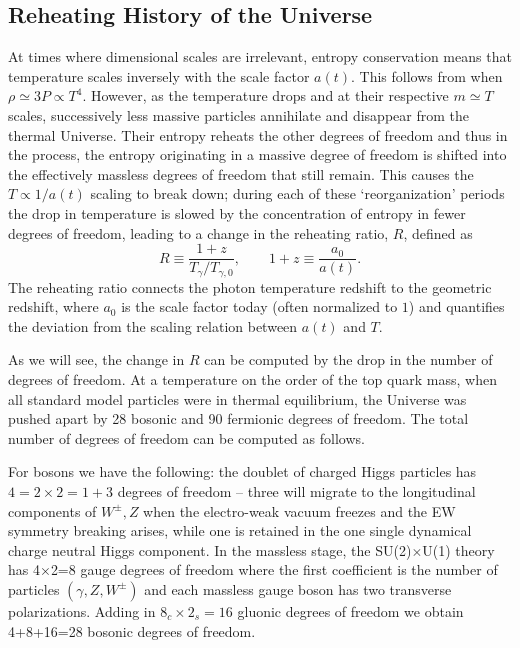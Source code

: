 
\subsection{Reheating History of the Universe}\label{Eralink}

At times where dimensional scales are irrelevant, entropy conservation means that  temperature scales inversely with the scale factor $a(t)$. This follows from  when $ \rho\simeq 3P   \propto T^4$. However, as the temperature drops and at their respective $m\simeq T$ scales, successively less massive particles annihilate and disappear from the thermal Universe. Their entropy reheats the other degrees of freedom and thus in the process, the entropy originating in a massive degree of freedom is shifted into the effectively massless degrees of freedom that still remain.  This causes the  $T\propto 1/a(t)$ scaling to break down; during each of these `reorganization' periods the drop in temperature is slowed by the concentration of entropy in fewer degrees of freedom, leading to a change in the reheating ratio, $R$, defined as
\begin{equation}\label{redshiftratio}
R\equiv \frac{1+z}{ T_\gamma/T_{\gamma,0}}, \qquad 1+z\equiv \frac{a_{0}}{a(t)}.
\end{equation}
The reheating ratio connects the photon temperature redshift to the geometric redshift, where $a_0$ is the scale factor today (often normalized to $1$) and quantifies the deviation from the scaling relation between $a(t)$ and $T$.

As we will see, the change in $R$ can be computed by the drop in the number of degrees of freedom.  At a temperature on the order of the top quark mass, when all standard model particles were in thermal equilibrium, the Universe was pushed apart by 28 bosonic and 90 fermionic degrees of freedom. The total number of degrees of freedom can be computed as follows.  

For bosons we have the following: the doublet of charged Higgs particles has $4=2\times2=1+3$  degrees of freedom -- three will migrate to the longitudinal components of $W^\pm, Z$ when the electro-weak vacuum freezes and the EW symmetry breaking arises, while one is retained in the one single dynamical charge neutral Higgs component. In the massless stage, the SU(2)$\times$U(1) theory has 4$\times$2=8 gauge degrees of freedom where the first coefficient  is  the number of particles $(\gamma, Z, W^\pm)$ and each massless gauge boson has  two transverse polarizations. Adding in $8_c\times2_s=16$ gluonic degrees of freedom we obtain 4+8+16=28  bosonic degrees of freedom. 

